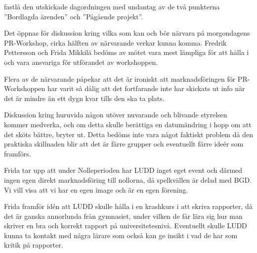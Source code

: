 \documentclass{protokoll}
\begin{document}
\newpage  


\begin{beslut}
     \att fastlå den utskickade dagordningen med undantag av de två punkterna ''Bordlagda ärenden'' och ''Pågående projekt''.
\end{beslut}

Det öppnas för diskussion kring vilka som kan och bör närvara på morgondagens PR-Workshop, cirka hälften av närvarande verkar kunna komma.
Fredrik Pettersson och Frida Mikkilä bedöms av mötet vara mest lämpliga för att hålla i och vara ansvariga för utförandet av workshoppen.  

Flera av de närvarande påpekar att det är ironiskt att marknadsföringen för PR-Workshoppen har varit så dålig att det fortfarande inte har skickats ut info när det är mindre än ett dygn kvar tills den ska ta plats.  

Diskussion kring huruvida någon utöver nuvarande och blivande styrelsen kommer medverka, och om detta skulle berättiga en datumändring i hopp om att det sköts bättre, bryter ut. Detta bedöms inte vara något faktiskt problem då den praktiska skillnaden blir att det är färre grupper och eventuellt färre ideér som framförs.

Frida tar upp att under Nolleperioden har LUDD inget eget event och därmed ingen egen direkt marknadsföring till nollorna, då spelkvällen är delad med BGD. Vi vill visa att vi har en egen image och är en egen förening.  

Frida framför idén att LUDD skulle hålla i en krashkurs i att skriva rapporter, då det är ganska annorlunda från gymnasiet, under vilken de får lära sig hur man skriver en bra och korrekt rapport på universitetesnivå. Eventuellt skulle LUDD kunna ta kontakt med några lärare som också kan ge insikt i vad de har som kritik på rapporter. 
\end{document}
